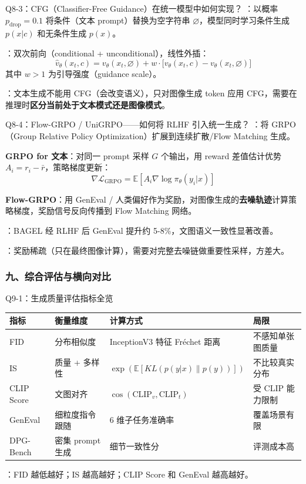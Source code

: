\begin{conceptbox}{Q8-3：CFG（Classifier-Free Guidance）在统一模型中如何实现？}
：以概率 $p_{\text{drop}} = 0.1$ 将条件（文本 prompt）替换为空字符串 $\varnothing$，模型同时学习条件生成 $p(x|c)$ 和无条件生成 $p(x)$。

：双次前向（conditional + unconditional），线性外插：
\[
\hat{v}_\theta(x_t, c) = v_\theta(x_t, \varnothing) + w \cdot \big[v_\theta(x_t, c) - v_\theta(x_t, \varnothing)\big]
\]
其中 $w > 1$ 为引导强度（guidance scale）。

：文本生成不能用 CFG（会改变语义），只对图像生成 token 应用 CFG，需要在推理时\textbf{区分当前处于文本模式还是图像模式}。
\end{conceptbox}

\begin{conceptbox}{Q8-4：Flow-GRPO / UniGRPO——如何将 RLHF 引入统一生成？}
：将 GRPO（Group Relative Policy Optimization）扩展到连续扩散/Flow Matching 生成。

\textbf{GRPO for 文本}：对同一 prompt 采样 $G$ 个输出，用 reward 差值估计优势 $A_i = r_i - \bar{r}$，策略梯度更新：
\[
\nabla \mathcal{L}_{\text{GRPO}} = \mathbb{E}\left[A_i \nabla \log \pi_\theta(y_i | x)\right]
\]

\textbf{Flow-GRPO}：用 GenEval / 人类偏好作为奖励，对图像生成的\textbf{去噪轨迹}计算策略梯度，奖励信号反向传播到 Flow Matching 网络。

：BAGEL 经 RLHF 后 GenEval 提升约 5-8\%，文图语义一致性显著改善。

：奖励稀疏（只在最终图像计算），需要对完整去噪链做重要性采样，方差大。
\end{conceptbox}

\subsubsection{九、综合评估与横向对比}

\begin{conceptbox}{Q9-1：生成质量评估指标全览}
\begin{center}
\small
\begin{tabular}{|l|l|l|l|}
\hline
\textbf{指标} & \textbf{衡量维度} & \textbf{计算方式} & \textbf{局限} \\
\hline
FID & 分布相似度 & InceptionV3 特征 Fréchet 距离 & 不感知单张图质量 \\
IS & 质量 + 多样性 & $\exp(\mathbb{E}[KL(p(y|x)\|p(y))])$ & 不比较真实分布 \\
CLIP Score & 文图对齐 & $\cos(\text{CLIP}_v, \text{CLIP}_t)$ & 受 CLIP 能力限制 \\
GenEval & 细粒度指令跟随 & 6 维子任务准确率 & 覆盖场景有限 \\
DPG-Bench & 密集 prompt 生成 & 细节一致性分 & 评测成本高 \\
\hline
\end{tabular}
\end{center}

：FID 越低越好；IS 越高越好；CLIP Score 和 GenEval 越高越好。
\end{conceptbox}

